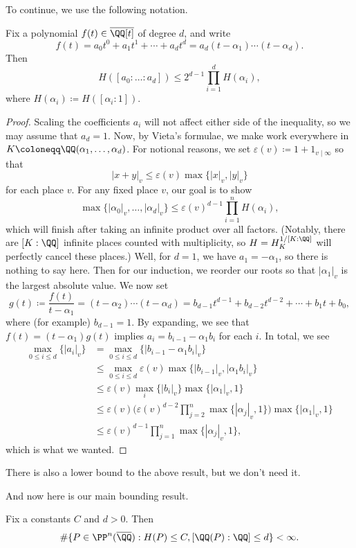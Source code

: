 \documentclass[../notes.tex]{subfiles}
\begin{document}
To continue, we use the following notation.
\begin{lemma}
	Fix a polynomial $f(t)\in\overline\QQ[t]$ of degree $d$, and write
	\[f(t)=a_0t^0+a_1t^1+\cdots+a_dt^d=a_d(t-\alpha_1)\cdots(t-\alpha_d).\]
	Then
	\[H([a_0:\ldots:a_d])\le 2^{d-1}\prod_{i=1}^dH(\alpha_i),\]
	where $H(\alpha_i)\coloneqq H([\alpha_i:1])$.
\end{lemma}
\begin{proof}
	Scaling the coefficients $a_i$ will not affect either side of the inequality, so we may assume that $a_d=1$. Now, by Vieta's formulae, we make work everywhere in $K\coloneqq\QQ(\alpha_1,\ldots,\alpha_d)$. For notional reasons, we set $\varepsilon(v)\coloneqq1+1_{v\mid\infty}$ so that
	\[|x+y|_v\le\varepsilon(v)\max\{|x|_v,|y|_v\}\]
	for each place $v$. For any fixed place $v$, our goal is to show
	\[\max\{|\alpha_0|_v,\ldots,|\alpha_d|_v\}\le\varepsilon(v)^{d-1}\prod_{i=1}^nH(\alpha_i),\]
	which will finish after taking an infinite product over all factors. (Notably, there are $[K:\QQ]$ infinite places counted with multiplicity, so $H=H_K^{1/[K:\QQ]}$ will perfectly cancel these places.) Well, for $d=1$, we have $a_1=-\alpha_1$, so there is nothing to say here. Then for our induction, we reorder our roots so that $|\alpha_1|_v$ is the largest absolute value. We now set
	\[g(t)\coloneqq\frac{f(t)}{t-\alpha_1}=(t-\alpha_2)\cdots(t-\alpha_d)=b_{d-1}t^{d-1}+b_{d-2}t^{d-2}+\cdots+b_1t+b_0,\]
	where (for example) $b_{d-1}=1$. By expanding, we see that $f(t)=(t-\alpha_1)g(t)$ implies $a_i=b_{i-1}-\alpha_1b_i$ for each $i$. In total, we see
	\begin{align*}
		\max_{0\le i\le d}\{|a_i|_v\} &= \max_{0\le i\le d}\{|b_{i-1}-\alpha_1b_i|_v\} \\
		&\le \max_{0\le i\le d}\varepsilon(v)\max\{|b_{i-1}|_v,|\alpha_1b_{i}|_v\} \\
		&\le\varepsilon(v)\max_{i}\{|b_i|_v\}\max\{|\alpha_1|_v,1\} \\
		&\le\varepsilon(v)\Bigg(\varepsilon(v)^{d-2}\prod_{j=2}^n\max\{|\alpha_j|_v,1\}\Bigg)\max\{|\alpha_1|_v,1\} \\
		&\le\varepsilon(v)^{d-1}\prod_{j=1}^n\max\{|\alpha_j|_v,1\},
	\end{align*}
	which is what we wanted.
\end{proof}
\begin{remark}
	There is also a lower bound to the above result, but we don't need it.
\end{remark}
And now here is our main bounding result.
\begin{theorem}
	Fix a constants $C$ and $d>0$. Then
	\[\#\{P\in\PP^n(\overline\QQ):H(P)\le C,[\QQ(P):\QQ]\le d\}<\infty.\]
\end{theorem}
\end{document}
